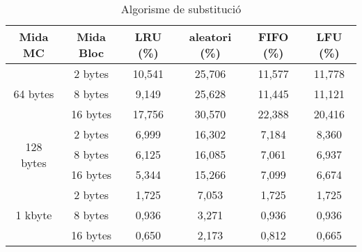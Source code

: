 \documentclass{article}
\begin{document}
\begin{table}[!h]
\begin{tabular}{|c|c|c|c|c|c|}
\hline
Mida MC & Mida Bloc & LRU (\%) & aleatori (\%) & FIFO (\%) & LFU (\%) \\
\hline
\multirow{3}{4em}{64 bytes}     & 2 bytes                        & 10,541                        & 25,706                             & 11,577                         & 11,778                        \\
                              & 8 bytes                        & 9,149                         & 25,628                             & 11,445                         & 11,121                        \\
                              & 16 bytes                       & 17,756                        & 30,570                             & 22,388                         & 20,416                        \\
\hline
\multirow{3}{4em}{128 bytes}    & 2 bytes                        & 6,999                         & 16,302                             & 7,184                          & 8,360                         \\
                              & 8 bytes                        & 6,125                         & 16,085                             & 7,061                          & 6,937                         \\
                              & 16 bytes                       & 5,344                         & 15,266                             & 7,099                          & 6,674                         \\
\hline
\multirow{3}{4em}{1 kbyte}      & 2 bytes                        & 1,725                         & 7,053                              & 1,725                          & 1,725                         \\
                              & 8 bytes                        & 0,936                         & 3,271                              & 0,936                          & 0,936                         \\
                              & 16 bytes                       & 0,650                         & 2,173                              & 0,812                          & 0,665                        
\\
\hline
\end{tabular}
\caption{Algorisme de substitució}
\label{tab:sub}
\end{table}
\end{document}

